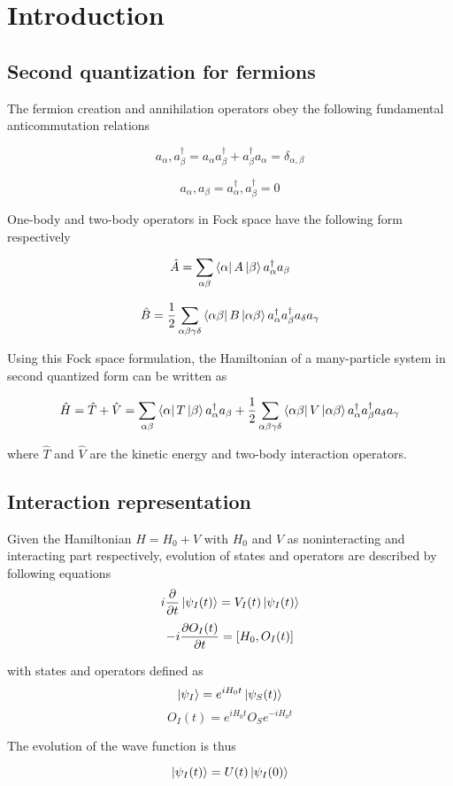 \section{Introduction}
\subsection{Second quantization for fermions}
The fermion creation and annihilation operators obey the following fundamental anticommutation relations

\[ {a_\alpha,a_\beta^\dagger} = a_\alpha a_\beta^\dagger + a_\beta^\dagger a_\alpha = \delta_{\alpha,\beta} \]

\[ {a_\alpha,a_\beta} = {a_\alpha^\dagger,a_\beta^\dagger} = 0 \]

One-body and two-body operators in Fock space have the following form respectively

\[ \hat{A} = \sum_{\alpha\beta}\bra{\alpha}A\ket{\beta}a_\alpha^\dagger a_\beta \]

\[ \hat{B} = \frac{1}{2} \sum_{\alpha\beta\gamma\delta}\bra{\alpha\beta}B\ket{\alpha\beta} a_\alpha^\dagger a_\beta^\dagger a_\delta a_\gamma \]

Using this Fock space formulation, the Hamiltonian of a many-particle system in second quantized form can be written as

\[ \hat{H} = \hat{T}+\hat{V} = \sum_{\alpha\beta}\bra{\alpha}T\ket{\beta}a_\alpha^\dagger a_\beta 
    + \frac{1}{2} \sum_{\alpha\beta\gamma\delta}\bra{\alpha\beta}V\ket{\alpha\beta} a_\alpha^\dagger a_\beta^\dagger a_\delta a_\gamma\]

where $\hat{T}$ and $\hat{V}$ are the kinetic energy and two-body interaction operators.

\subsection{Interaction representation}
Given the Hamiltonian $H=H_0+V$ with $H_0$ and $V$ as noninteracting and interacting part respectively,
evolution of states and operators are described by following equations
\[ i\frac{\partial }{\partial t}\ket{\psi_I(t)}=V_I(t)\ket{\psi_I(t)} \]
\[ -i\frac{\partial O_I(t)}{\partial t}=\left[H_0,O_I(t)\right] \]

with states and operators defined as
\[ \ket{\psi_I} = e^{i H_0 t}\ket{\psi_S(t)} \]
\[ O_I(t) = e^{i H_0 t} O_S e^{-i H_0 t} \] 

The evolution of the wave function is thus

\[ \ket{\psi_I(t)} = U(t) \ket{\psi_I(0)} \]

